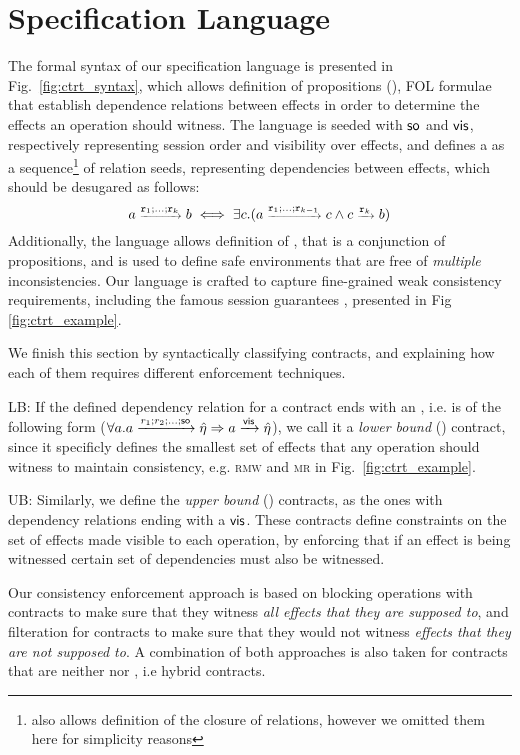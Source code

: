 \section {Specification Language} 
\label{sec:ctrt_language}

The formal syntax of our specification language is presented in
Fig.~\ref{fig:ctrt_syntax}, which allows definition of propositions
(\propS{}), FOL formulae that 
establish dependence relations between effects in order to determine
the effects an operation should witness.
The language is seeded with ${\textsf{so}}$ and ${\normalfont \textsf{vis}}$, respectively representing session
order and visibility over effects, 
and defines a \relationS{} as a sequence\footnote{\tool also allows
definition of the closure of relations, however we omitted them here for
simplicity reasons} of relation seeds, representing dependencies between effects,  
which should be desugared as
follows:
\begin{equation} \scriptsize
a \xrightarrow{\mathtt{r}_1;...;\mathtt{r}_k} b \iff \exists c. (a
\xrightarrow{\mathtt{r}_1;...;\mathtt{r}_{k-1}} c
\wedge c \xrightarrow {\mathtt{r}_k} b)
\end{equation}
Additionally, the language allows definition of \specS{}, that is a
conjunction of propositions, and is used to define safe environments that are 
free of \emph{multiple} inconsistencies. 
Our language is crafted to capture fine-grained weak consistency
requirements, including the famous session guarantees \cite{terry}, presented
in Fig \ref{fig:ctrt_example}.

%
%

We finish this section by syntactically classifying 
contracts, and explaining how each of them requires different
enforcement techniques.
\begin{description}
\item {\textsf LB}: If the defined dependency relation for a contract ends with an \soZ, i.e. is of
the following form ({\scriptsize $\forall a. a
\xrightarrow{r_1;r_2;...;{\textsf{so}}} \hat{\eta}
\Rightarrow a \xrightarrow{{\normalfont \textsf{vis}}} \hat{\eta}$}), we call it a \emph{lower
bound} (\LB{}) contract, since it specificly defines the smallest set of
effects that any operation should witness to maintain consistency, e.g.
\textsc{rmw} and \textsc{mr} in Fig.~\ref{fig:ctrt_example}.

\item {\textsf UB}: Similarly, we define the \emph{upper bound} (\UB{})
contracts, as the ones with dependency relations ending with a ${\normalfont \textsf{vis}}$.
These contracts define constraints on the set of effects made visible
to each operation, by enforcing that if an effect is being witnessed
certain set of dependencies must also be witnessed.
\end{description}
Our consistency enforcement approach is based on blocking operations with \LB{}
contracts to make sure that they witness \emph{all effects that they are
supposed to}, and filteration for \UB{} contracts to make sure that they
would not witness \emph{effects that they are not supposed
to}. A combination of both approaches is also taken for contracts that are
neither  \LB{} nor \UB{}, i.e hybrid contracts.

